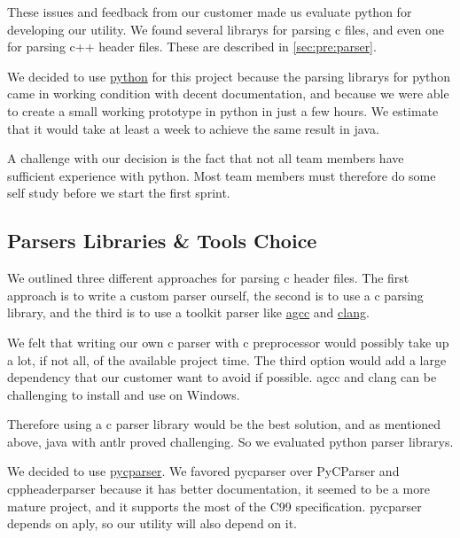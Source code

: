 These issues and feedback from our customer made us evaluate \Gls{python} for
developing our \gls{utility}. We found several \glspl{library} for parsing \Gls{c} files, and
even one for parsing \Gls{c++} \gls{header} files. These are described in
\autoref{sec:pre:parser}.

We decided to use \hyperref[sec:pre:python]{\Gls{python}} for this project because
the parsing \glspl{library} for \Gls{python} came in working condition with decent
documentation, and because we were able to create a small working prototype
in \Gls{python} in just a few hours. We estimate that it would take at least a week
to achieve the same result in \Gls{java}.

A challenge with our decision is the fact that not all team members have
sufficient experience with \Gls{python}. Most team members must therefore do some
self study before we start the first sprint.

\subsection{Parsers Libraries \& Tools Choice}
\label{sec:pre:parserchoice}
We outlined three different approaches for parsing \Gls{c} \gls{header} files. The first approach is to
write a custom \gls{parser} ourself, the second is to use a \Gls{c} parsing \gls{library}, and the
third is to use a toolkit \gls{parser} like \hyperref[sec:pre:gcc]{\Gls{agcc}} and
\hyperref[sec:pre:clang]{\Gls{clang}}.

We felt that writing our own \Gls{c} \gls{parser} with \Gls{c} \gls{preprocessor} would possibly take
up a lot, if not all, of the available project time. The third option would add
a large dependency that our customer want to avoid if possible. \Gls{agcc} and \Gls{clang}
can be challenging to install and use on Windows.

Therefore using a \Gls{c} \gls{parser} \gls{library} would be the best solution, and as mentioned
above, \Gls{java} with \gls{antlr} proved challenging. So we evaluated \Gls{python} \gls{parser}
\glspl{library}.

We decided to use \hyperref[sec:pre:pycparser]{\gls{pycparser}}. We favored \gls{pycparser}
over PyCParser and cppheaderparser because it has better documentation, it
seemed to be a more mature project, and it supports the most of the \Gls{C99}
specification. \gls{pycparser} depends on \Gls{aply}, so our \gls{utility} will also depend on it.

